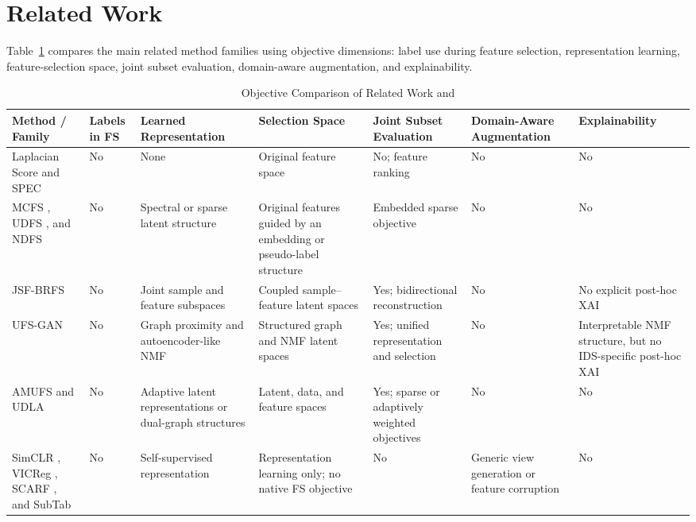 \section{Related Work}
\label{sec:related}

Table~\ref{tab:related} compares the main related method families using objective dimensions: label use during feature selection, representation learning, feature-selection space, joint subset evaluation, domain-aware augmentation, and explainability.

\begin{table}[t]
\caption{Objective Comparison of Related Work and \method}
\label{tab:related}
\centering
\footnotesize
\setlength{\tabcolsep}{4pt}
\begin{tabularx}{\textwidth}{@{}>{\raggedright\arraybackslash}p{2.9cm} >{\raggedright\arraybackslash}p{1.0cm} >{\raggedright\arraybackslash}X >{\raggedright\arraybackslash}X >{\raggedright\arraybackslash}p{2.5cm} >{\raggedright\arraybackslash}p{2.6cm} >{\raggedright\arraybackslash}p{2.4cm}@{}}
\toprule
Method / Family & Labels in FS & Learned Representation & Selection Space & Joint Subset Evaluation & Domain-Aware Augmentation & Explainability \\
\midrule
Laplacian Score \cite{he2005laplacian} and SPEC \cite{zhao2007spectral} & No & None & Original feature space & No; feature ranking & No & No \\
MCFS \cite{cai2010unsupervised}, UDFS \cite{yang2011l2}, and NDFS \cite{li2012unsupervised} & No & Spectral or sparse latent structure & Original features guided by an embedding or pseudo-label structure & Embedded sparse objective & No & No \\
JSF-BRFS \cite{maleknia2026joint} & No & Joint sample and feature subspaces & Coupled sample--feature latent spaces & Yes; bidirectional reconstruction & No & No explicit post-hoc XAI \\
UFS-GAN \cite{pakmanesh2026unsupervised} & No & Graph proximity and autoencoder-like NMF & Structured graph and NMF latent spaces & Yes; unified representation and selection & No & Interpretable NMF structure, but no IDS-specific post-hoc XAI \\
AMUFS \cite{gao2026unsupervised} and UDLA \cite{wang2026unsupervised} & No & Adaptive latent representations or dual-graph structures & Latent, data, and feature spaces & Yes; sparse or adaptively weighted objectives & No & No \\
SimCLR \cite{chen2020simple}, VICReg \cite{bardes2022vicreg}, SCARF \cite{bahri2022scarf}, and SubTab \cite{ucar2021subtab} & No & Self-supervised representation & Representation learning only; no native FS objective & No & Generic view generation or feature corruption & No \\

\end{tabularx}
\end{table}
